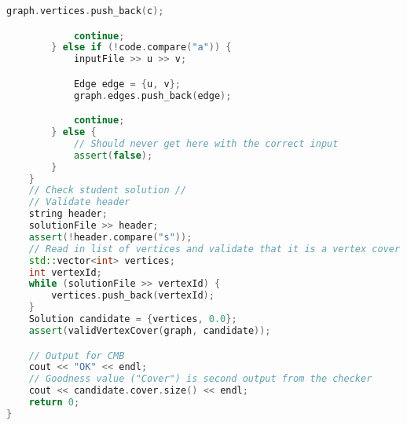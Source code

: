 \begin{lstlisting}[language=c++]
            graph.vertices.push_back(c);

            continue;
        } else if (!code.compare("a")) {
            inputFile >> u >> v;

            Edge edge = {u, v};
            graph.edges.push_back(edge);

            continue;
        } else {
            // Should never get here with the correct input
            assert(false);
        }
    }
    // Check student solution //
    // Validate header
    string header;
    solutionFile >> header;
    assert(!header.compare("s"));
    // Read in list of vertices and validate that it is a vertex cover
    std::vector<int> vertices;
    int vertexId;
    while (solutionFile >> vertexId) {
        vertices.push_back(vertexId);
    }
    Solution candidate = {vertices, 0.0};
    assert(validVertexCover(graph, candidate));

    // Output for CMB
    cout << "OK" << endl;
    // Goodness value ("Cover") is second output from the checker
    cout << candidate.cover.size() << endl;
    return 0;
}
\end{lstlisting}
